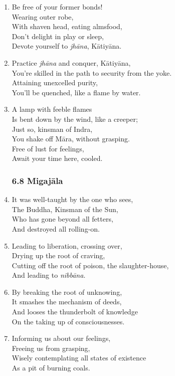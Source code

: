 \documentclass[10pt, openany]{book}
\begin{document}
\begin{enumerate}
\item Be free of your former bonds!\\
Wearing outer robe, \\
With shaven head, eating almsfood,\\
Don’t delight in play or sleep,\\
Devote yourself to \emph{jhāna}, Kātiyāna.

\item Practice \emph{jhāna} and conquer, Kātiyāna,\\
You’re skilled in the path to security from the yoke.\\
Attaining unexcelled purity,\\
You’ll be quenched, like a flame by water.

\item A lamp with feeble flames\\
Is bent down by the wind, like a creeper;\\
Just so, kinsman of Indra,\\
You shake off Māra, without grasping.\\
Free of lust for feelings,\\
Await your time here, cooled.

\subsubsection*{6.8 Migajāla}

\item It was well-taught by the one who sees,\\
The Buddha, Kinsman of the Sun,\\
Who has gone beyond all fetters,\\
And destroyed all rolling-on.

\item Leading to liberation, crossing over,\\
Drying up the root of craving,\\
Cutting off the root of poison, the slaughter-house,\\
And leading to \emph{nibbāna}.

\item By breaking the root of unknowing,\\
It smashes the mechanism of deeds,\\
And looses the thunderbolt of knowledge\\
On the taking up of consciousnesses.

\item Informing us about our feelings,\\
Freeing us from grasping,\\
Wisely contemplating all states of existence\\
As a pit of burning coals.


\end{enumerate}
\end{document}
